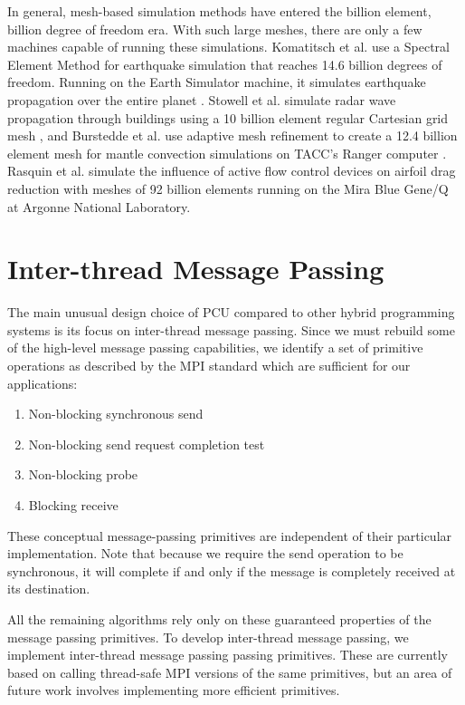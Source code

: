 \documentclass[final,1p,times]{elsarticle}
\begin{document}
In general, mesh-based simulation methods have entered the billion element,
billion degree of freedom era.
With such large meshes, there are only a few machines capable of running
these simulations.
Komatitsch et al. use a Spectral Element Method for earthquake simulation
that reaches 14.6 billion degrees of freedom.
Running on the Earth Simulator machine, it simulates earthquake propagation
over the entire planet \cite{komatitsch200314}.
Stowell et al. simulate radar wave propagation through buildings using
a 10 billion element regular Cartesian grid mesh
\cite{stowell2008investigation},
and Burstedde et al. use adaptive mesh refinement to create a
12.4 billion element mesh for mantle convection simulations
on TACC's Ranger computer \cite{burstedde2008scalable}.
Rasquin et al. \cite{rasquin2014scalable} simulate the influence of active flow control
devices on airfoil drag reduction with meshes of 92 billion elements
running on the Mira Blue Gene/Q at Argonne National Laboratory.

\section{Inter-thread Message Passing}
\label{sec:p2p}

The main unusual design choice of PCU compared to
other hybrid programming systems is
its focus on inter-thread message passing.
Since we must rebuild some of the high-level message
passing capabilities, we identify a set of primitive
operations as described by the MPI standard \cite{walker1996mpi}
which are sufficient for our applications:

\begin{enumerate}
\item Non-blocking synchronous send
\item Non-blocking send request completion test
\item Non-blocking probe
\item Blocking receive
\end{enumerate}

These conceptual message-passing primitives are independent
of their particular implementation.
Note that because we require the send operation to be synchronous,
it will complete if and only if the message is completely received at its
destination.

All the remaining algorithms rely only on these guaranteed properties
of the message passing primitives.
To develop inter-thread message passing, we implement inter-thread
message passing passing primitives.
These are currently based on calling thread-safe MPI versions of the
same primitives, but an area of future work involves implementing
more efficient primitives.
\end{document}
